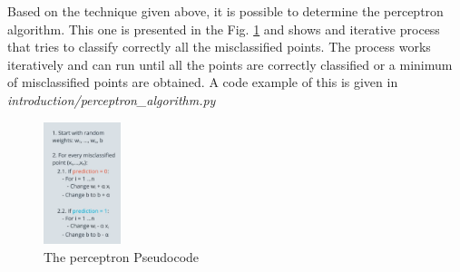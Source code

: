 \documentclass{article}
\begin{document}
Based on the technique given above, it is possible to determine the perceptron algorithm. This one is presented in the Fig. \ref{fig:f16} and shows and iterative process that tries to classify correctly all the misclassified points. The process works iteratively and can run until all the points are correctly classified or a minimum of misclassified points are obtained. A code example of this is given in \textit{introduction/perceptron_algorithm.py}
  
\begin{figure}[ht]
    \centering
    \includegraphics[width=0.2\textwidth,height=0.2\textheight,keepaspectratio]{images/perceotron_algorithm.png}
    \captionsetup{justification=centering}
    \caption{The perceptron Pseudocode}
    \label{fig:f16}
\end{figure}
  
\end{document}
